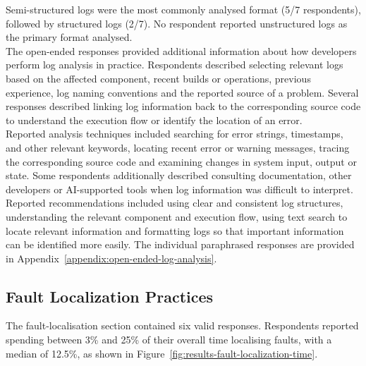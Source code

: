 Semi-structured logs were the most commonly analysed format (5/7 respondents),
followed by structured logs (2/7). No respondent reported unstructured logs as the
primary format analysed.
\\
The open-ended responses provided additional information about how developers perform
log analysis in practice. Respondents described selecting relevant logs based on the
affected component, recent builds or operations, previous experience, log naming
conventions and the reported source of a problem. Several responses described linking
log information back to the corresponding source code to understand the
execution flow or identify the location of an error.
\\
Reported analysis techniques included searching for error strings, timestamps, and
other relevant keywords, locating recent error or warning messages, tracing the
corresponding source code and examining changes in system input, output or state.
Some respondents additionally described consulting documentation, other developers
or AI-supported tools when log information was difficult to interpret.
\\
Reported recommendations included using clear and consistent log structures,
understanding the relevant component and execution flow, using text search to locate
relevant information and formatting logs so that important information can be
identified more easily. The individual paraphrased responses are provided in
Appendix~\ref{appendix:open-ended-log-analysis}.


\subsection{Fault Localization Practices}

The fault-localisation section contained six valid responses. Respondents reported
spending between 3\% and 25\% of their overall time localising faults, with a median
of 12.5\%, as shown in Figure~\ref{fig:results-fault-localization-time}.

